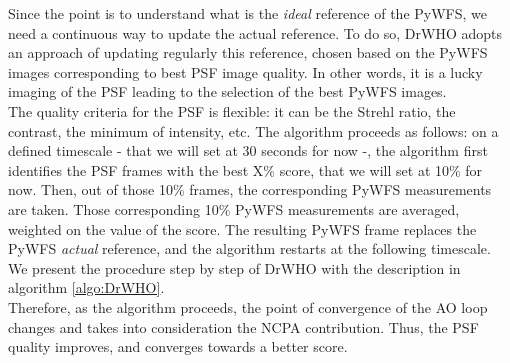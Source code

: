 \documentclass[twocolumn]{aastex62}
\begin{document}
Since the point is to understand what is the \textit{ideal} reference of the PyWFS, we need a continuous way to update the actual reference. To do so, DrWHO adopts an approach of updating regularly this reference, chosen based on the PyWFS images corresponding to best PSF image quality. In other words, it is a lucky imaging of the PSF leading to the selection of the best PyWFS images. \\
The quality criteria for the PSF is flexible: it can be the Strehl ratio, the contrast, the minimum of intensity, etc. The algorithm proceeds as follows: on a defined timescale - that we will set at 30 seconds for now -, the algorithm first identifies the PSF frames with the best X\% score, that we will set at 10\% for now. Then, out of those 10\% frames, the corresponding PyWFS measurements are taken. Those corresponding 10\% PyWFS measurements are averaged, weighted on the value of the score. The resulting PyWFS frame replaces the PyWFS \textit{actual} reference, and the algorithm restarts at the following timescale. We present the procedure step by step of DrWHO with the  description in algorithm \ref{algo:DrWHO}.\\

Therefore, as the algorithm proceeds, the point of convergence of the AO loop changes and takes into consideration the NCPA contribution. Thus, the PSF quality improves, and converges towards a better score. \\



\end{document}
